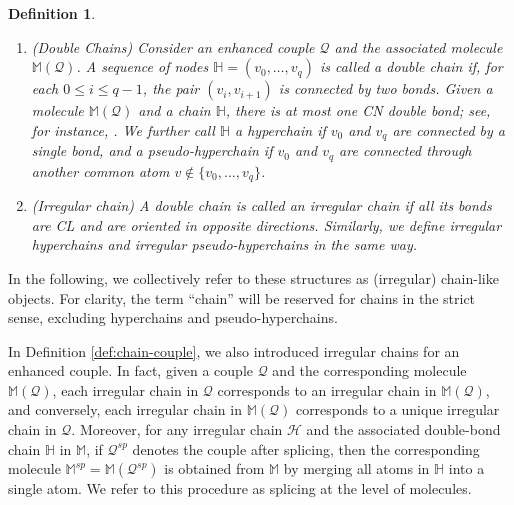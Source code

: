 \documentclass[UTF-8,reqno]{amsart}
\numberwithin{equation}{section}
\newtheorem{definition}[theorem]{Definition}
\theoremstyle{definition}
\def\leq{\leqslant}
\def\leq{\leqslant}
\begin{document}
\begin{definition}
\begin{enumerate}
\item (Double Chains)\label{def:chain-molecule}
Consider an enhanced couple $\mathcal{Q}$ and the associated molecule $\mathbb{M}(\mathcal{Q})$. A sequence of nodes $\mathbb{H}=(v_0,\ldots,v_q)$ is called a double chain if, for each $0\leq i\leq q-1$, the pair $(v_i,v_{i+1})$ is connected by two bonds.
Given a molecule $\mathbb{M}(\mathcal{Q})$ and a chain $\mathbb{H}$, there is at most one CN double bond; see, for instance, \cite[Proposition 5.7]{DH23a}.
We further call $\mathbb{H}$ a hyperchain if $v_0$ and $v_q$ are connected by a single bond, and a  pseudo-hyperchain if $v_0$ and $v_q$ are connected through another common atom $v\notin\{v_0,\ldots,v_q\}$.
 
\item  (Irregular chain) A double chain is called an irregular chain if all its bonds are CL and are oriented in opposite directions. Similarly, we define irregular hyperchains and irregular pseudo-hyperchains in the same way.
\end{enumerate}
\end{definition}
In the following, we collectively refer to these structures as (irregular) chain-like objects. For clarity, the term “chain” will be reserved for chains in the strict sense, excluding hyperchains and pseudo-hyperchains.

In Definition \ref{def:chain-couple}, we also introduced irregular chains for an enhanced couple. In fact, given a couple $\mathcal{Q}$ and the corresponding molecule $\mathbb{M}(\mathcal{Q})$, each irregular chain in $\mathcal{Q}$ corresponds to an irregular chain in $\mathbb{M}(\mathcal{Q})$, and conversely, each irregular chain in $\mathbb{M}(\mathcal{Q})$ corresponds to a unique irregular chain in $\mathcal{Q}$.
Moreover, for any irregular chain $\mathcal{H}$ and the associated double-bond chain $\mathbb{H}$ in $\mathbb{M}$, if $\mathcal{Q}^{sp}$ denotes the couple after splicing, then the corresponding molecule $\mathbb{M}^{sp}=\mathbb{M}(\mathcal{Q}^{sp})$ is obtained from $\mathbb{M}$ by merging all atoms in $\mathbb{H}$ into a single atom. We refer to this procedure as splicing at the level of molecules.
\end{document}

